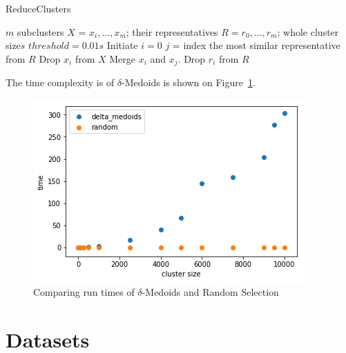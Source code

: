 \documentclass[thesis=B,english]{FITthesis}[2012/10/20]
\begin{document}

\begin{algorithm}
    \caption{ReduceClusters}
    \label{alg:reduce}
    \begin{algorithmic}[1]
        \INPUT $m$ subclusters $X$ = $x_i, ..., x_m$; their representatives $R = r_0, ..., r_m$; whole cluster size$s$
        \STATE $threshold = 0.01s$
        \STATE Initiate $i = 0$
                    \STATE $j$ = index the most similar representative from $R$
                        \STATE Drop $x_i$ from $X$
                    \ELSE
                        \STATE Merge $x_i$ and $x_j$.
                    \ENDIF
                    \STATE Drop $r_i$ from $R$
                \ENDIF
            \ENDWHILE
        \ENDIF
    \end{algorithmic}
\end{algorithm}

The time complexity is of $\delta$-Medoids is shown on Figure~\ref{img:complexity}.

\begin{figure}
  \includegraphics[width=\linewidth]{img/complexity.png}
  \caption{Comparing run times of $\delta$-Medoids and Random Selection}
  \label{img:complexity}
\end{figure}


\chapter{Datasets}\label{ch:datasets}
\end{document}
